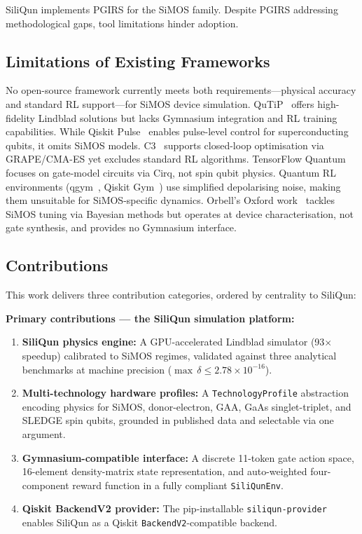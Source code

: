 SiliQun implements PGIRS for the SiMOS family. Despite PGIRS addressing methodological gaps, tool limitations hinder adoption.  

\subsection{Limitations of Existing Frameworks}
\label{subsec:intro_limitations}

No open-source framework currently meets both requirements—physical accuracy and standard RL support—for SiMOS device simulation. QuTiP~\cite{Lambert2024} offers high-fidelity Lindblad solutions but lacks Gymnasium integration and RL training capabilities. While Qiskit Pulse~\cite{Alexander2020} enables pulse-level control for superconducting qubits, it omits SiMOS models. C3~\cite{Wittler2021} supports closed-loop optimisation via GRAPE/CMA-ES yet excludes standard RL algorithms. TensorFlow Quantum~\cite{Broughton2020} focuses on gate-model circuits via Cirq, not spin qubit physics. Quantum RL environments (qgym~\cite{VanDerLinde2023}, Qiskit Gym~\cite{QiskitGym2024}) use simplified depolarising noise, making them unsuitable for SiMOS-specific dynamics. Orbell's Oxford work~\cite{Orbell2024} tackles SiMOS tuning via Bayesian methods but operates at device characterisation, not gate synthesis, and provides no Gymnasium interface.  

\subsection{Contributions}
\label{subsec:contributions}

This work delivers three contribution categories, ordered by centrality to SiliQun:  

\textbf{Primary contributions --- the SiliQun simulation platform:}  
\begin{enumerate}
  \item \textbf{SiliQun physics engine:} A GPU-accelerated Lindblad simulator (93$\times$ speedup) calibrated to SiMOS regimes, validated against three analytical benchmarks at machine precision ($\max\,\delta \leq 2.78 \times 10^{-16}$).  
  \item \textbf{Multi-technology hardware profiles:} A \texttt{TechnologyProfile} abstraction encoding physics for SiMOS, donor-electron, GAA, GaAs singlet-triplet, and SLEDGE spin qubits, grounded in published data and selectable via one argument.  
  \item \textbf{Gymnasium-compatible interface:} A discrete 11-token gate action space, 16-element density-matrix state representation, and auto-weighted four-component reward function in a fully compliant \texttt{SiliQunEnv}.  
  \item \textbf{Qiskit BackendV2 provider:} The pip-installable \texttt{siliqun-provider} enables SiliQun as a Qiskit \texttt{BackendV2}-compatible backend.  
\end{enumerate}